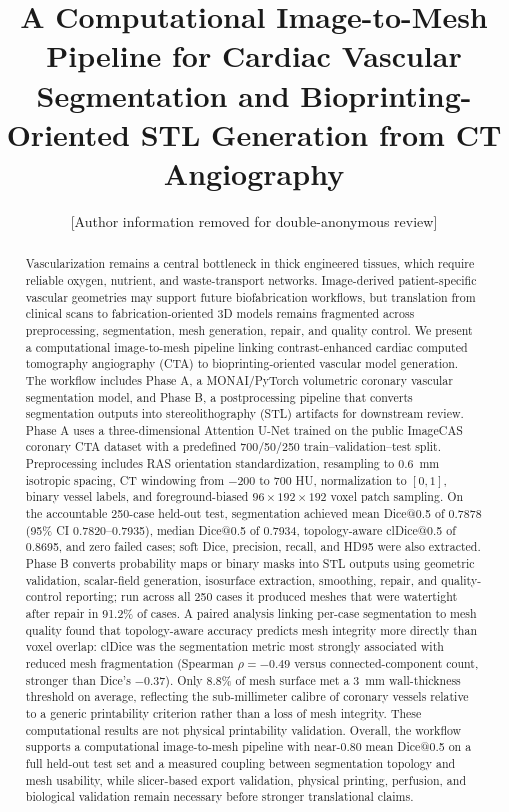 \documentclass[anonymous]{iopjournal}
\begin{document}

\title{A Computational Image-to-Mesh Pipeline for Cardiac Vascular Segmentation and Bioprinting-Oriented STL Generation from CT Angiography}

\author{[Author information removed for double-anonymous review]}


\begin{abstract}
Vascularization remains a central bottleneck in thick engineered tissues, which require reliable oxygen, nutrient, and waste-transport networks. Image-derived patient-specific vascular geometries may support future biofabrication workflows, but translation from clinical scans to fabrication-oriented 3D models remains fragmented across preprocessing, segmentation, mesh generation, repair, and quality control. We present a computational image-to-mesh pipeline linking contrast-enhanced cardiac computed tomography angiography (CTA) to bioprinting-oriented vascular model generation. The workflow includes Phase A, a MONAI/PyTorch volumetric coronary vascular segmentation model, and Phase B, a postprocessing pipeline that converts segmentation outputs into stereolithography (STL) artifacts for downstream review. Phase A uses a three-dimensional Attention U-Net trained on the public ImageCAS coronary CTA dataset with a predefined 700/50/250 train--validation--test split. Preprocessing includes RAS orientation standardization, resampling to \SI{0.6}{mm} isotropic spacing, CT windowing from $-200$ to $700$ HU, normalization to $[0,1]$, binary vessel labels, and foreground-biased $96\times192\times192$ voxel patch sampling. On the accountable 250-case held-out test, segmentation achieved mean Dice@0.5 of 0.7878 (95\% CI 0.7820--0.7935), median Dice@0.5 of 0.7934, topology-aware clDice@0.5 of 0.8695, and zero failed cases; soft Dice, precision, recall, and HD95 were also extracted. Phase B converts probability maps or binary masks into STL outputs using geometric validation, scalar-field generation, isosurface extraction, smoothing, repair, and quality-control reporting; run across all 250 cases it produced meshes that were watertight after repair in 91.2\% of cases. A paired analysis linking per-case segmentation to mesh quality found that topology-aware accuracy predicts mesh integrity more directly than voxel overlap: clDice was the segmentation metric most strongly associated with reduced mesh fragmentation (Spearman $\rho=-0.49$ versus connected-component count, stronger than Dice's $-0.37$). Only 8.8\% of mesh surface met a \SI{3}{mm} wall-thickness threshold on average, reflecting the sub-millimeter calibre of coronary vessels relative to a generic printability criterion rather than a loss of mesh integrity. These computational results are not physical printability validation. Overall, the workflow supports a computational image-to-mesh pipeline with near-0.80 mean Dice@0.5 on a full held-out test set and a measured coupling between segmentation topology and mesh usability, while slicer-based export validation, physical printing, perfusion, and biological validation remain necessary before stronger translational claims.


\end{abstract}
\end{document}
